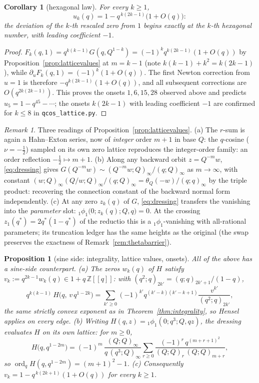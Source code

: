 \documentclass[11pt]{article}
\theoremstyle{plain}
\newtheorem{corollary}[theorem]{Corollary}
\newtheorem{proposition}[theorem]{Proposition}
\theoremstyle{definition}
\theoremstyle{remark}
\newtheorem{remark}[theorem]{Remark}
\newcommand{\Z}{\mathbb{Z}}
\begin{document}
\begin{corollary}[hexagonal law]\label{cor:hexagonal}
For every $k\ge1$,
\[
   u_k(q)=1-q^{\,k(2k-1)}\bigl(1+O(q)\bigr):
\]
the deviation of the $k$-th rescaled zero from $1$ begins exactly at the $k$-th hexagonal number,
with leading coefficient $-1$.
\end{corollary}

\begin{proof}
$F_k(q,1)=q^{k(k-1)}G(q,Q^{1-k})=(-1)^kq^{k(2k-1)}(1+O(q))$ by
Proposition~\ref{prop:latticevalues} at $m=k-1$ (note $k(k-1)+k^2=k(2k-1)$), while
$\partial_uF_k(q,1)=(-1)^k(1+O(q))$. The first Newton correction from $u=1$ is therefore
$-q^{k(2k-1)}(1+O(q))$, and all subsequent corrections are $O(q^{2k(2k-1)})$. This proves the
onsets $1,6,15,28$ observed above and predicts $u_5=1-q^{45}-\cdots$; the onsets
$k(2k-1)$ with leading coefficient $-1$ are confirmed for $k\le8$ in
\texttt{qcos\_lattice.py}.
\end{proof}

\begin{remark}\label{rem:latticevalues}
Three readings of Proposition~\ref{prop:latticevalues}. (a) The $r$-sum is again a Hahn--Exton
series, now of \emph{integer} order $m+1$ in base $Q$: the $q$-cosine ($\nu=-\tfrac12$) sampled
on its own zero lattice reproduces the integer-order family: an order reflection
$-\tfrac12\mapsto m+1$. (b) Along any backward orbit $z=Q^{-m}w$, \eqref{eq:dressing} gives
$G(Q^{-m}w)\sim(Q^{-m}w;Q)_\infty/(q;Q)_\infty$ as $m\to\infty$, with constant
$(w;Q)_\infty(Q/w;Q)_\infty/(q;Q)_\infty=\theta_Q(-w)/(q;q)_\infty$ by the triple product: recovering the connection constant of the backward normal form independently. (c) At any zero
$z_k(q)$ of $G$, \eqref{eq:dressing} transfers the vanishing into the \emph{parameter} slot:
${}_1\phi_1\bigl(0;z_k(q);Q,q\bigr)=0$. At the crossing $z_1(q^\ast)=2q^\ast(1-q^\ast)$ of the
reductio this is a ${}_1\phi_1$-vanishing with all-rational parameters; its truncation ledger has
the same heights as the original (the swap preserves the exactness of
Remark~\ref{rem:thetabarrier}).
\end{remark}

\begin{proposition}[sine side: integrality, lattice values, onsets]\label{prop:sinelattice}
All of the above has a sine-side counterpart. (a) The zeros $w_k(q)$ of $H$ satisfy
$v_k:=q^{2k-1}w_k(q)\in1+q\,\Z[[q]]$: with $(q^2;q)_{2k'}=(q;q)_{2k'+1}/(1-q)$,
\[
   q^{k(k-1)}\,H\bigl(q,\,v\,q^{1-2k}\bigr)
   =\sum_{k'\ge0}(-1)^{k'}q^{(k'-k)(k'-k+1)}\frac{v^{k'}}{(q^2;q)_{2k'}},
\]
the same strictly convex exponent as in Theorem~\ref{thm:integrality}, so Hensel applies on every
edge. (b) Writing $H(q,z)={}_1\phi_1(0;q^3;Q,qz)$, the dressing evaluates $H$ on its own lattice:
for $m\ge0$,
\[
   H\bigl(q,q^{1-2m}\bigr)=(-1)^m\,\frac{(Q;Q)_\infty}{q\,(q^3;Q)_\infty}
   \sum_{r\ge0}\frac{(-1)^r\,q^{(m+r+1)^2}}{(Q;Q)_r\,(Q;Q)_{m+r}},
\]
so $\operatorname{ord}_qH(q,q^{1-2m})=(m+1)^2-1$. (c) Consequently
$v_k=1-q^{\,k(2k+1)}(1+O(q))$ for every $k\ge1$.
\end{proposition}
\end{document}
